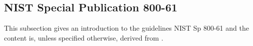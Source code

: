 \subsection{\acs{NIST} Special Publication 800-61}
This subsection gives an introduction to the guidelines \acs{NIST} Sp 800-61 and the content is, unless specified otherwise, derived from \cite{nist800-61}. 